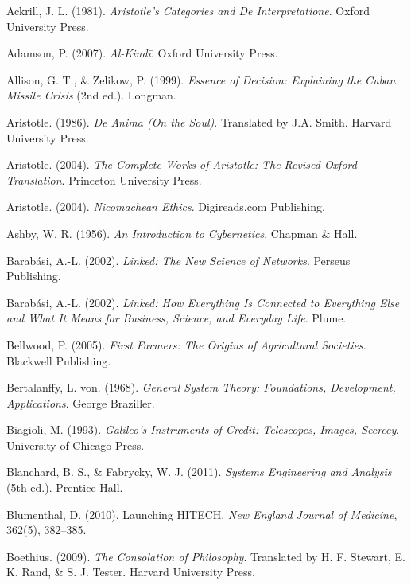 \documentclass[twocolumn]{article}
\begin{document}
\begin{thebibliography}{99}

Ackrill, J. L. (1981). \textit{Aristotle’s Categories and De Interpretatione}. Oxford University Press.

Adamson, P. (2007). \textit{Al-Kindī}. Oxford University Press.

Allison, G. T., \& Zelikow, P. (1999). \textit{Essence of Decision: Explaining the Cuban Missile Crisis} (2nd ed.). Longman.

Aristotle. (1986). \textit{De Anima (On the Soul)}. Translated by J.A. Smith. Harvard University Press.

Aristotle. (2004). \textit{The Complete Works of Aristotle: The Revised Oxford Translation}. Princeton University Press.

Aristotle. (2004). \textit{Nicomachean Ethics}. Digireads.com Publishing.

Ashby, W. R. (1956). \textit{An Introduction to Cybernetics}. Chapman \& Hall.

Barabási, A.-L. (2002). \textit{Linked: The New Science of Networks}. Perseus Publishing.

Barabási, A.-L. (2002). \textit{Linked: How Everything Is Connected to Everything Else and What It Means for Business, Science, and Everyday Life}. Plume.

Bellwood, P. (2005). \textit{First Farmers: The Origins of Agricultural Societies}. Blackwell Publishing.

Bertalanffy, L. von. (1968). \textit{General System Theory: Foundations, Development, Applications}. George Braziller.

Biagioli, M. (1993). \textit{Galileo’s Instruments of Credit: Telescopes, Images, Secrecy}. University of Chicago Press.

Blanchard, B. S., \& Fabrycky, W. J. (2011). \textit{Systems Engineering and Analysis} (5th ed.). Prentice Hall.

Blumenthal, D. (2010). Launching HITECH. \textit{New England Journal of Medicine}, 362(5), 382–385.

Boethius. (2009). \textit{The Consolation of Philosophy}. Translated by H. F. Stewart, E. K. Rand, \& S. J. Tester. Harvard University Press.


\end{thebibliography}
\end{document}
